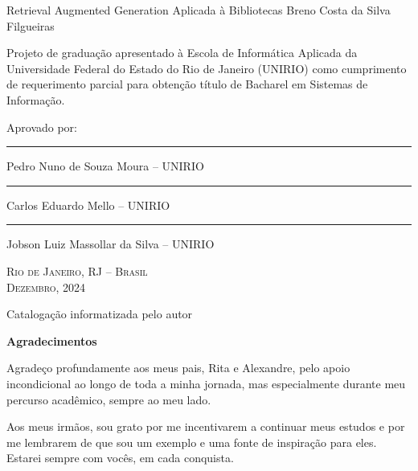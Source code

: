 \documentclass[a4paper, 12pt]{article}
\begin{document}
    \clearpage

    \begin{center}
        Retrieval Augmented Generation Aplicada à Bibliotecas
        \vskip 0.5cm
        Breno Costa da Silva Filgueiras
        \vskip 2.0cm
    \end{center}

    \begin{flushright}
        \parbox{8.0cm}{
        Projeto de graduação apresentado à Escola de Informática Aplicada
        da Universidade Federal do Estado do Rio de Janeiro (UNIRIO) como
        cumprimento de requerimento parcial para obtenção título de Bacharel em
        Sistemas de Informação.}
        \vskip 1.5cm
        Aprovado por:
        \vskip 1.5cm
        \rule{10.0cm}{.1mm}

        Pedro Nuno de Souza Moura -- UNIRIO
        \vskip 1.0cm
        
        \rule{10.0cm}{.1mm}

        Carlos Eduardo Mello -- UNIRIO
        \vskip 1.0cm

        \rule{10.0cm}{.1mm}

        Jobson Luiz Massollar da Silva -- UNIRIO
        \vskip 1.0cm
    \end{flushright}
    \begin{center}
        \textsc{Rio de Janeiro, RJ -- Brasil} \\ \textsc{Dezembro, 2024}
    \end{center}
    \clearpage

    \vfill
    
    \begin{center}
        Catalogação informatizada pelo autor
    \end{center}

    \clearpage

    \begin{flushright}
        \textbf{Agradecimentos}
    \end{flushright}
    \normalsize
    
    Agradeço profundamente aos meus pais, Rita e Alexandre, pelo apoio incondicional ao longo de toda a minha jornada, mas especialmente durante meu percurso acadêmico, sempre ao meu lado.

    Aos meus irmãos, sou grato por me incentivarem a continuar meus estudos e por me lembrarem de que sou um exemplo e uma fonte de inspiração para eles. Estarei sempre com vocês, em cada conquista.
    
\end{document}
